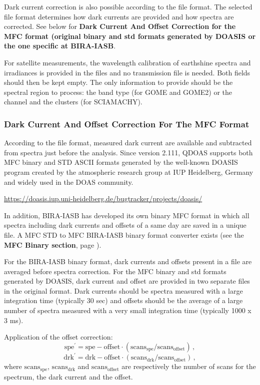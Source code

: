 Dark current correction is also possible according to the file format. The selected file format determines how dark currents are provided and how spectra are corrected.  See below for \textbf{Dark Current And Offset Correction for the MFC format (original binary and std formats generated by DOASIS or the one specific at BIRA-IASB}.

For satellite measurements, the wavelength calibration of earthshine spectra and irradiances is provided in the files and no transmission file is needed. Both fields should then be kept empty. The only information to provide should be the spectral region to process: the band type (for GOME and GOME2) or the channel and the clusters (for SCIAMACHY).

\subsubsection{Dark Current And Offset Correction For The MFC Format}
According to the file format, measured dark current are available and
subtracted from spectra just before the analysis.  Since version
2.111, QDOAS supports both MFC binary and STD ASCII formats generated
by the well-known DOASIS program created by the atmospheric research
group at IUP Heidelberg, Germany and widely used in the DOAS community.

\begin{center}
\href{https://doasis.iup.uni-heidelberg.de/bugtracker/projects/doasis/}{https://doasis.iup.uni-heidelberg.de/bugtracker/projects/doasis/}
\end{center}

In addition, BIRA-IASB has developed its own binary MFC format in which all spectra including dark currents and offsets of a same day are saved in a unique file.  A MFC STD to MFC BIRA-IASB binary format converter exists (see the \textbf{MFC Binary section}, page \pageref{sec:MFC_bin}).

For the BIRA-IASB binary format, dark currents and offsets present in a file are averaged before spectra correction.  For the MFC binary and std formats generated by DOASIS, dark current and offset are provided in two separate files in the original format.  Dark currents should be spectra measured with a large integration time (typically 30 sec) and offsets should be the average of a large number of spectra measured with a very small integration time (typically 1000 x 3 ms).

Application of the offset correction:
\begin{equation}
\mathrm{spe}^\prime=\mathrm{spe}-\mathrm{offset}\cdot(\mathrm{scans}_\mathrm{spe}/\mathrm{scans}_\mathrm{offset})\, ,
\end{equation}
\begin{equation}
\mathrm{drk}^\prime=\mathrm{drk}-\mathrm{offset}\cdot(\mathrm{scans}_\mathrm{drk}/\mathrm{scans}_\mathrm{offset})\, ,
\end{equation}
where $\mathrm{scans}_\mathrm{spe}$, $\mathrm{scans}_\mathrm{drk}$ and $\mathrm{scans}_\mathrm{offset}$ are respectively the number of scans for the spectrum, the dark current and the offset.

